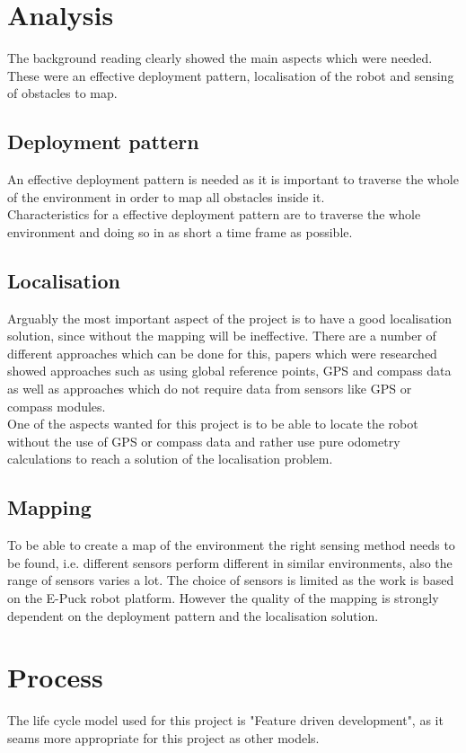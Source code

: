 \section{Analysis}
The background reading clearly showed the main aspects which were needed.\\
These were an effective deployment pattern, localisation of the robot and sensing of obstacles to map. 

\subsection{Deployment pattern}
An effective deployment pattern is needed as it is important to traverse the whole of the environment in order to map all obstacles inside it.\\
Characteristics for a effective deployment pattern are to traverse the whole environment and doing so in as short a time frame as possible.

\subsection{Localisation}
Arguably the most important aspect of the project is to have a good localisation solution, since without the mapping will be ineffective. There are a number of different approaches which can be done for this, papers which were researched showed approaches such as using global reference points, GPS and compass data as well as approaches which do not require data from sensors like GPS or compass modules.\\
One of the aspects wanted for this project is to be able to locate the robot without the use of GPS or compass data and rather use pure odometry calculations to reach a solution of the localisation problem.

\subsection{Mapping}
To be able to create a map of the environment the right sensing method needs to be found, i.e. different sensors perform different in similar environments, also the range of sensors varies a lot. 
The choice of sensors is limited as the work is based on the E-Puck robot platform.
However the quality of the mapping is strongly dependent on the deployment pattern and the localisation solution.

\section{Process}
The life cycle model used for this project is "Feature driven development", as it seams more appropriate for this project as other models. 

